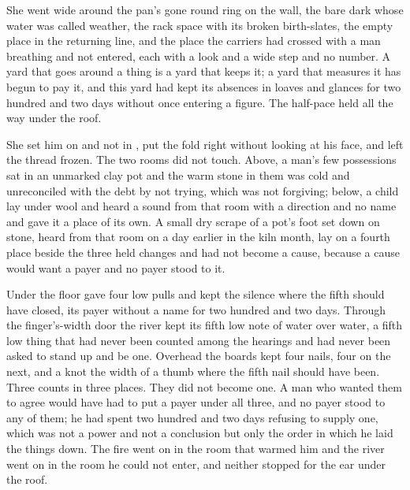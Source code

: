 She went wide around the pan's gone round ring on the wall, the bare dark  whose water was called weather, the rack space with its broken birth-slates, the empty place in the returning line, and the place the carriers had crossed with a man breathing and not entered, each with a look and a wide step and no number. A yard that goes around a thing is a yard that keeps it; a yard that measures it has begun to pay it, and this yard had kept its absences in loaves and glances for two hundred and two days without once entering a figure. The half-pace held all the way under the roof.

\scenebreak

She set him on  and not in , put the fold right without looking at his face, and left the thread frozen. The two rooms did not touch. Above, a man's few possessions sat in an unmarked clay pot and the warm stone in them was cold and unreconciled with the debt by not trying, which was not forgiving; below, a child lay under wool and heard a sound from that room with a direction and no name and gave it a place of its own. A small dry scrape of a pot's foot set down on stone, heard from that room on a day earlier in the kiln month, lay on a fourth place beside the three held changes and had not become a cause, because a cause would want a payer and no payer stood to it.

Under the floor  gave four low pulls and kept the silence where the fifth should have closed, its payer without a name for two hundred and two days. Through the finger's-width door the river kept its fifth low note of water over water, a fifth low thing that had never been counted among the hearings and had never been asked to stand up and be one. Overhead the boards kept four nails, four on the next, and a knot the width of a thumb where the fifth nail should have been. Three counts in three places. They did not become one. A man who wanted them to agree would have had to put a payer under all three, and no payer stood to any of them; he had spent two hundred and two days refusing to supply one, which was not a power and not a conclusion but only the order in which he laid the things down. The fire went on in the room that warmed him and the river went on in the room he could not enter, and neither stopped for the ear under the roof.

\scenebreak

